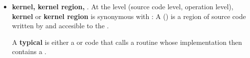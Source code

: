 \documentclass{article}
\begin{document}
\begin{itemize}
Example:
\begin{lstlisting}[%float=!h,
caption=
{ {Example of a \cellloopnest with surrounding \tileloop.
   The \tileloop consists of all the code shown, lines 1--15.
   The \tileloopbody consists of the code on lines 2--13.
   The \tileloop contains a \cellloopnest, which consists only of the code on lines 5--11.
    }},identifierstyle=\small\texttt,
   linewidth=0.99\linewidth,basewidth={0.58em,0.45em},
   label=tab-lst:CombinedLoopNest]
  do while(itor%isValid())
     call itor%currentTile(tileDesc)
     call tileDesc%getDataPtr(U, CENTER)

     do k=limits(LOW,KAXIS),limits(HIGH,KAXIS)
        do j=limits(LOW,JAXIS),limits(HIGH,JAXIS)
           do i=limits(LOW,IAXIS),limits(HIGH,IAXIS)
              U(i,j,k,MOMX_VAR) = U(i,j,k,DENS_VAR) * U(i,j,k,VELX_VAR)
           end do
        end do
     end do

     call tileDesc%releaseDataPtr(U, CENTER)
     call itor%next()
  end do
\end{lstlisting}
\item \textbf{kernel, kernel region, \ULKR}.
At the \PUD level (source code level, operation level), \textbf{kernel} or \textbf{kernel region}
is synonymous with \textbf{\ULKR}:
A \spelledoutULKR (\shortULKR) is a region of source code written by and accesible to
the \spelledoutPUD \PUD.

A \textbf{typical} \ULKR is either a \cellloopnest or code that calls a routine whose implementation
then contains a \cellloopnest.


\end{itemize}
\end{document}
